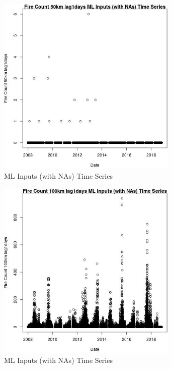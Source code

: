 \begin{figure} 
\centering  
\includegraphics[width=0.77\textwidth]{Code_Outputs/Report_ML_input_PM25_Step4_part_e_de_duplicated_aves_compiled_2019-05-20wNAs_Fire_Count_50km_lag1daysvDate.jpg} 
\caption{\label{fig:Report_ML_input_PM25_Step4_part_e_de_duplicated_aves_compiled_2019-05-20wNAsFire_Count_50km_lag1daysvDate}ML Inputs (with NAs) Time Series} 
\end{figure} 
 

\begin{figure} 
\centering  
\includegraphics[width=0.77\textwidth]{Code_Outputs/Report_ML_input_PM25_Step4_part_e_de_duplicated_aves_compiled_2019-05-20wNAs_Fire_Count_100km_lag1daysvDate.jpg} 
\caption{\label{fig:Report_ML_input_PM25_Step4_part_e_de_duplicated_aves_compiled_2019-05-20wNAsFire_Count_100km_lag1daysvDate}ML Inputs (with NAs) Time Series} 
\end{figure} 
 

